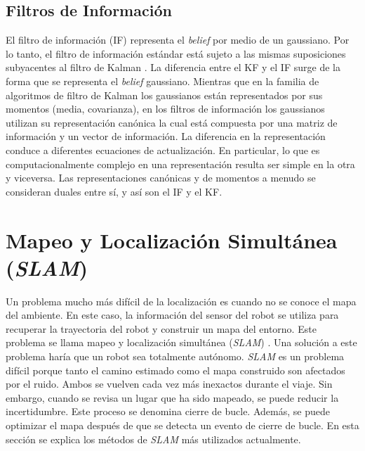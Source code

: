 \subsection{Filtros de Informaci\'on}
El filtro de informaci\'on (IF) representa el \textit{belief} por medio de un 
gaussiano. Por lo tanto, el filtro de informaci\'on est\'andar est\'a sujeto a las 
mismas suposiciones subyacentes al filtro de Kalman \cite{thrun2005multi}. La 
diferencia entre el KF y el IF surge de la forma que se representa el \textit{belief} 
gaussiano. Mientras que en la familia de algoritmos de filtro de Kalman los 
gaussianos est\'an representados por sus momentos (media, covarianza), en los 
filtros de informaci\'on los gaussianos utilizan su representaci\'on can\'onica la cual
est\'a compuesta por una matriz de informaci\'on y un vector de informaci\'on. La 
diferencia en la representaci\'on conduce a diferentes ecuaciones de 
actualizaci\'on. En particular, lo que es computacionalmente complejo en una 
representaci\'on resulta ser simple en la otra y viceversa. Las representaciones 
can\'onicas y de momentos a menudo se consideran duales entre s\'i, y as\'i son el 
IF y el KF.

\section{Mapeo y Localizaci\'on Simult\'anea (\textit{SLAM})}
Un problema mucho m\'as dif\'icil de la localizaci\'on es cuando no se conoce el 
mapa del ambiente. En este caso, la informaci\'on del sensor del robot se utiliza 
para recuperar la trayectoria del robot y construir un mapa del entorno. Este problema 
se llama mapeo y localizaci\'on simult\'anea (\textit{SLAM}) \cite{Thrun2005}. Una 
soluci\'on a este problema har\'ia que un robot sea totalmente aut\'onomo. \textit{SLAM} 
es un problema dif\'icil porque tanto el camino estimado como el mapa construido son 
afectados por el ruido. Ambos se vuelven cada vez m\'as inexactos durante el viaje. Sin 
embargo, cuando se revisa un lugar que ha sido mapeado, se puede reducir la 
incertidumbre. Este proceso se denomina cierre de bucle. Adem\'as, se puede optimizar 
el mapa despu\'es de que se detecta un evento de cierre de bucle. En esta secci\'on se 
explica los m\'etodos de \textit{SLAM} m\'as utilizados actualmente.

